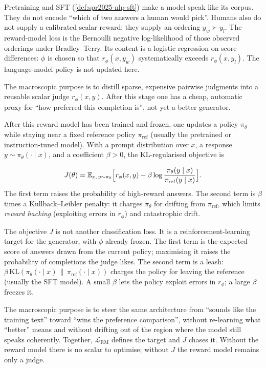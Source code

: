 \documentclass[11pt,a4paper]{article}
\theoremstyle{definition}
\begin{document}
\begin{note}\label{note:spr2025-nlp-rm-loss}
Pretraining and SFT (\cref{def:spr2025-nlp-sft}) make a model speak like its corpus. They do not encode ``which of two answers a human would pick''. Humans also do not supply a calibrated scalar reward; they supply an ordering \(y_w\succ y_l\). The reward-model loss is the Bernoulli negative log-likelihood of those observed orderings under Bradley--Terry. Its content is a logistic regression on score differences: \(\phi\) is chosen so that \(r_\phi(x,y_w)\) systematically exceeds \(r_\phi(x,y_l)\). The language-model policy is not updated here.

The macroscopic purpose is to distill sparse, expensive pairwise judgments into a reusable scalar judge \(r_\phi(x,y)\). After this stage one has a cheap, automatic proxy for ``how preferred this completion is'', not yet a better generator.
\end{note}

After this reward model has been trained and frozen, one updates a policy \(\pi_\theta\) while staying near a fixed reference policy \(\pi_{\mathrm{ref}}\) (usually the pretrained or instruction-tuned model). With a prompt distribution over \(x\), a response \(y\sim\pi_\theta(\cdot\mid x)\), and a coefficient \(\beta>0\), the KL-regularised objective is

\[
J(\theta)
=\mathbb{E}_{x,\,y\sim\pi_\theta}
\Bigl[
r_\phi(x,y)
-\beta\log\frac{\pi_\theta(y\mid x)}{\pi_{\mathrm{ref}}(y\mid x)}
\Bigr].
\]
The first term raises the probability of high-reward answers. The second term is \(\beta\) times a Kullback--Leibler penalty: it charges \(\pi_\theta\) for drifting from \(\pi_{\mathrm{ref}}\), which limits \emph{reward hacking} (exploiting errors in \(r_\phi\)) and catastrophic drift.

\begin{note}\label{note:spr2025-nlp-rlhf-j}
The objective \(J\) is not another classification loss. It is a reinforcement-learning target for the generator, with \(\phi\) already frozen. The first term is the expected score of answers drawn from the current policy; maximising it raises the probability of completions the judge likes. The second term is a leash: \(\beta\,\mathrm{KL}(\pi_\theta(\cdot\mid x)\,\|\,\pi_{\mathrm{ref}}(\cdot\mid x))\) charges the policy for leaving the reference (usually the SFT model). A small \(\beta\) lets the policy exploit errors in \(r_\phi\); a large \(\beta\) freezes it.

The macroscopic purpose is to steer the same architecture from ``sounds like the training text'' toward ``wins the preference comparison'', without re-learning what ``better'' means and without drifting out of the region where the model still speaks coherently. Together, \(\mathcal{L}_{\mathrm{RM}}\) defines the target and \(J\) chases it. Without the reward model there is no scalar to optimise; without \(J\) the reward model remains only a judge.
\end{note}
\end{document}
